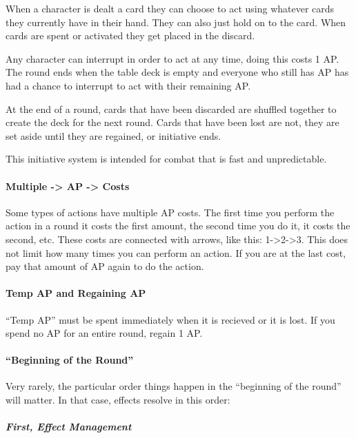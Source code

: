 \documentclass[
  letterpaper,
  DIV=11,
  numbers=noendperiod]{scrartcl}
\let\oldparagraph\paragraph
\renewcommand{\paragraph}[1]{\oldparagraph{#1}\mbox{}}
\let\oldsubparagraph\subparagraph
\renewcommand{\subparagraph}[1]{\oldsubparagraph{#1}\mbox{}}
\begin{document}
When a character is dealt a card they can choose to act using whatever
cards they currently have in their hand. They can also just hold on to
the card. When cards are spent or activated they get placed in the
discard.

Any character can interrupt in order to act at any time, doing this
costs 1 AP. The round ends when the table deck is empty and everyone who
still has AP has had a chance to interrupt to act with their remaining
AP.

At the end of a round, cards that have been discarded are shuffled
together to create the deck for the next round. Cards that have been
lost are not, they are set aside until they are regained, or initiative
ends.

This initiative system is intended for combat that is fast and
unpredictable.

\paragraph{Multiple -\textgreater{} AP -\textgreater{}
Costs}\label{multiple---ap---costs}

Some types of actions have multiple AP costs. The first time you perform
the action in a round it costs the first amount, the second time you do
it, it costs the second, etc. These costs are connected with arrows,
like this: 1-\textgreater2-\textgreater3. This does not limit how many
times you can perform an action. If you are at the last cost, pay that
amount of AP again to do the action.

\paragraph{Temp AP and Regaining AP}\label{temp-ap-and-regaining-ap}

``Temp AP'' must be spent immediately when it is recieved or it is lost.
If you spend no AP for an entire round, regain 1 AP.

\paragraph{``Beginning of the Round''}\label{beginning-of-the-round}

Very rarely, the particular order things happen in the ``beginning of
the round'' will matter. In that case, effects resolve in this order:

\subparagraph{First, Effect Management}\label{first-effect-management}
\end{document}
